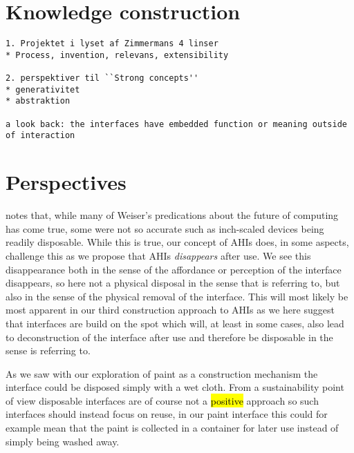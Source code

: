 

\section{Knowledge construction}

\begin{verbatim}
1. Projektet i lyset af Zimmermans 4 linser
* Process, invention, relevans, extensibility

2. perspektiver til ``Strong concepts''
* generativitet
* abstraktion

a look back: the interfaces have embedded function or meaning outside of interaction
\end{verbatim}

\section{Perspectives}

\citet{abowd2012next} notes that, while many of Weiser's predications about the future of computing has come true, some were not so accurate such as inch-scaled devices being readily disposable.
While this is true, our concept of AHIs does, in some aspects, challenge this as we propose that AHIs \emph{disappears} after use.
We see this disappearance both in the sense of the affordance or perception of the interface disappears, so here not a physical disposal in the sense that \citeauthor{abowd2012next} is referring to, but also in the sense of the physical removal of the interface.
This will most likely be most apparent in our third construction approach to AHIs as we here suggest that interfaces are build on the spot which will, at least in some cases, also lead to deconstruction of the interface after use and therefore be disposable in the sense \citeauthor{abowd2012next} is referring to.

As we saw with our exploration of paint as a construction mechanism the interface could be disposed simply with a wet cloth.
From a sustainability point of view disposable interfaces are of course not a \hl{positive} approach so such interfaces should instead focus on reuse, in our paint interface this could for example mean that the paint is collected in a container for later use instead of simply being washed away. 

